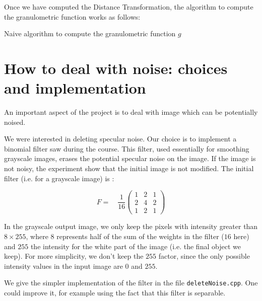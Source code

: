 Once we have computed the Distance Transformation, the algorithm to compute the granulometric function works as follows:

\IncMargin{1em}
\begin{algorithm}
\caption{Naive algorithm to compute the granulometric function $g$}
\label{algo-naive}
\end{algorithm}

\section{How to deal with noise: choices and implementation}

An important aspect of the project is to deal with image which can be potentially noised.

We were interested in deleting specular noise. Our choice is to implement a binomial filter saw during the course. This filter, used essentially for smoothing grayscale images, erases the potential specular noise on the image. If the image is not noisy, the experiment show that the initial image is not modified. The initial filter (i.e. for a grayscale image) is :

\setcounter{MaxMatrixCols}{3}
\[ F = \quad \frac{1}{16} \begin{pmatrix}
1 & 2 & 1 \\
2 & 4 & 2 \\
1 & 2 & 1
\end{pmatrix}\]

In the grayscale output image, we only keep the pixels with intensity greater than $8 \times 255$, where $8$ represents half of the sum of the weights in the filter ($16$ here) and $255$ the intensity for the white part of the image (i.e. the final object we keep). For more simplicity, we don't keep the $255$ factor, since the only possible intensity values in the input image are $0$ and $255$.

We give the simpler implementation of the filter in the file \texttt{deleteNoise.cpp}. One could improve it, for example using the fact that this filter is separable.


